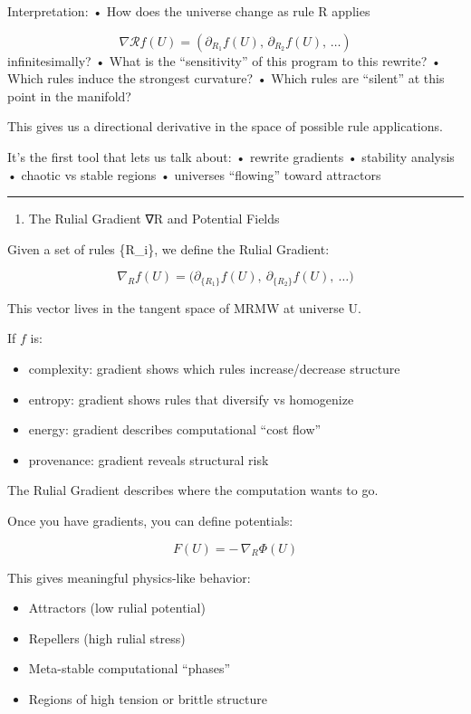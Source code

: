 Interpretation: • How does the universe change as rule R applies

\[
  \nabla \mathcal{R} f(U) =
  \left( \partial_{R_1} f(U),\, \partial_{R_2} f(U),\, \dots \right)
\]
infinitesimally? • What is the ``sensitivity'' of this program to this
rewrite? • Which rules induce the strongest curvature? • Which rules are
``silent'' at this point in the manifold?

This gives us a directional derivative in the space of possible rule
applications.

It's the first tool that lets us talk about: • rewrite gradients •
stability analysis • chaotic vs stable regions • universes ``flowing''
toward attractors

\begin{center}\rule{0.5\linewidth}{0.5pt}\end{center}

\begin{enumerate}
\def\labelenumi{\arabic{enumi}.}
\setcounter{enumi}{3}
\tightlist
\item
  The Rulial Gradient ∇R and Potential Fields
\end{enumerate}

Given a set of rules \{R\_i\}, we define the Rulial Gradient:

\[
\nabla_R f(U) = \bigl( \partial_{\{R_1\}} f(U),\ \partial_{\{R_2\}} f(U),\ \ldots \bigr)
\]

This vector lives in the tangent space of MRMW at universe U.

If $f$ is:
\begin{itemize}[nosep]
  \item complexity: gradient shows which rules increase/decrease structure
  \item entropy: gradient shows rules that diversify vs homogenize
  \item energy: gradient describes computational ``cost flow''
  \item provenance: gradient reveals structural risk
\end{itemize}

The Rulial Gradient describes where the computation wants to go.

Once you have gradients, you can define potentials:

\[
F(U) = -\,\nabla_R \Phi(U)
\]

This gives meaningful physics-like behavior:
\begin{itemize}[nosep]
  \item Attractors (low rulial potential)
  \item Repellers (high rulial stress)
  \item Meta-stable computational ``phases''
  \item Regions of high tension or brittle structure
\end{itemize}

